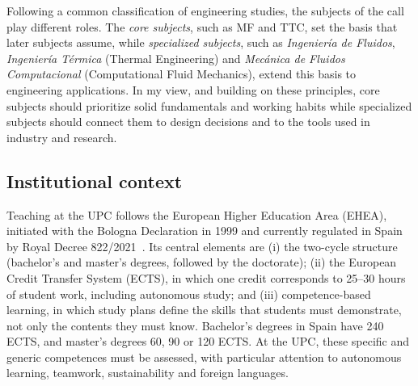 \documentclass[11pt]{article}
\begin{document}
\begin{itemize}
\end{itemize}

Following a common classification of engineering studies, the subjects of the call play different roles.
The \emph{core subjects}, such as MF and TTC, set the basis that later subjects assume, while \emph{specialized subjects}, such as \textit{Ingenier\'ia de Fluidos}, \textit{Ingenier\'ia T\'ermica} (Thermal Engineering) and \textit{Mec\'anica de Fluidos Computacional} (Computational Fluid Mechanics), extend this basis to engineering applications. 
In my view, and building on these principles, core subjects should prioritize solid fundamentals and working habits while specialized subjects should connect them to design decisions and to the tools used in industry and research.


\newpage
\subsection{Institutional context}\label{sec:context}

Teaching at the UPC follows the European Higher Education Area (EHEA), initiated with the Bologna Declaration in 1999 and currently regulated in Spain by Royal Decree 822/2021~\cite{RD822}. 
Its central elements are 
(i) the two-cycle structure (bachelor's and master's degrees, followed by the doctorate); 
(ii) the European Credit Transfer System (ECTS), in which one credit corresponds to 25--30 hours of student work, including autonomous study; and 
(iii) competence-based learning, in which study plans define the skills that students must demonstrate, not only the contents they must know. 
Bachelor's degrees in Spain have 240 ECTS, and master's degrees 60, 90 or 120 ECTS. 
At the UPC, these specific and generic competences must be assessed, with particular attention to autonomous learning, teamwork, sustainability and foreign languages.
\end{document}
